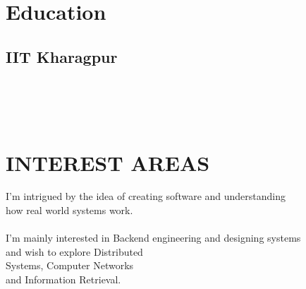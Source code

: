 \documentclass[]{deedy-resume-openfont}
\begin{document}
%
%

%
%

\begin{minipage}[t]{0.33\textwidth} 


\section{Education} 

\subsection{IIT Kharagpur}
\sectionsep
\\~\\~\\

\section{INTEREST AREAS}
I'm intrigued by the idea of creating software and understanding \\ how real world systems work. \\~\\
I'm mainly interested in Backend engineering and designing systems \\ and wish to explore Distributed \\ Systems, Computer Networks \\ and Information Retrieval. 
\sectionsep
\\~\\~\\



\end{minipage}
\end{document}
